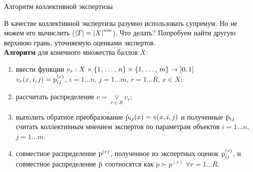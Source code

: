 \begin{frame}{Алгоритм коллективной экспертизы}
 \begin{center}
      \vspace{-2em}
	В качестве коллективной экспертизы разумно использовать супремум. Но не можем его вычислить ($\left| T \right| = \left| X \right|^{nm}$). %
	Что делать? Попробуем найти другую верхнюю грань, уточняемую оценками экспертов.
	\\[3ex] \textbf{Алгоритм} для конечного множества баллов $X$: 
	\vspace{-2mm}
	\begin{enumerate}
		\item ввести функции $v_r: X \times \{1,\, \ldots,\, n\} \times \{1,\, \ldots,\, m\} \rightarrow [0,1]$ 
		\\ $v_r(x, i, j) = {\mathrm{p}}_{ij}^{(r)}$, { \footnotesize $i = 1 \ldots n$, $j = 1 \ldots m$, $r = 1 \ldots R$, $x \in X$};
		\item рассчитать распределение $v = \underset{r \in R} \vee  v_r$; 
		\item выполить обратное преобразование $\check{{\mathrm{p}}}_{ij}(x) = v(x, i,j)$ и полученные $\check{{\mathrm{p}}}_{ij}$  считать коллективным мнением экспертов по параметрам объектов {\footnotesize $i = 1 \ldots n$, $j = 1 \ldots m$}.
		\item совместное распределение ${\mathrm{p}}^{(r)}$, полученное из экспертных оценок ${\mathrm{p}}_{ij}^{(r)}$, и совместное распределение $\check{{\mathrm{p}}}$ соотносятся как $\check{p} \succ p^{(r)}$  $\forall r = 1 \ldots R$. 
	\end{enumerate}	
 \end{center}
\end{frame} %

